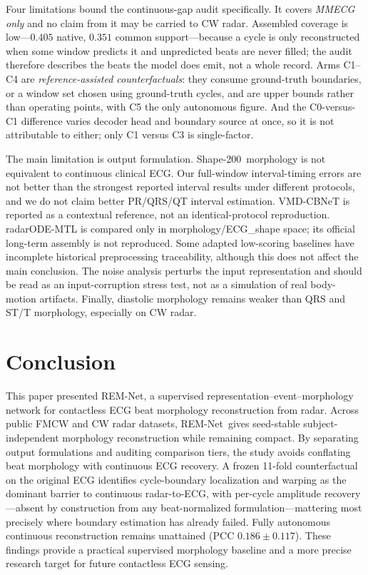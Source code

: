 \documentclass[lettersize,journal]{IEEEtran}
\newcommand{\remnet}{REM-Net\xspace}
\newcommand{\shape}{Shape-200\xspace}
\begin{document}
Four limitations bound the continuous-gap audit specifically. It covers \emph{MMECG only} and no claim from it may be carried to CW radar. Assembled coverage is low---$0.405$ native, $0.351$ common support---because a cycle is only reconstructed when some window predicts it and unpredicted beats are never filled; the audit therefore describes the beats the model does emit, not a whole record. Arms C1--C4 are \emph{reference-assisted counterfactuals}: they consume ground-truth boundaries, or a window set chosen using ground-truth cycles, and are upper bounds rather than operating points, with C5 the only autonomous figure. And the C0-versus-C1 difference varies decoder head and boundary source at once, so it is not attributable to either; only C1 versus C3 is single-factor.

The main limitation is output formulation. \shape\ morphology is not equivalent to continuous clinical ECG. Our full-window interval-timing errors are not better than the strongest reported interval results under different protocols, and we do not claim better PR/QRS/QT interval estimation. VMD-CBNeT is reported as a contextual reference, not an identical-protocol reproduction. radarODE-MTL is compared only in morphology/ECG\_shape space; its official long-term assembly is not reproduced. Some adapted low-scoring baselines have incomplete historical preprocessing traceability, although this does not affect the main conclusion. The noise analysis perturbs the input representation and should be read as an input-corruption stress test, not as a simulation of real body-motion artifacts. Finally, diastolic morphology remains weaker than QRS and ST/T morphology, especially on CW radar.

\section{Conclusion}
This paper presented \remnet, a supervised representation--event--morphology network for contactless ECG beat morphology reconstruction from radar. Across public FMCW and CW radar datasets, \remnet\ gives seed-stable subject-independent morphology reconstruction while remaining compact. By separating output formulations and auditing comparison tiers, the study avoids conflating beat morphology with continuous ECG recovery. A frozen 11-fold counterfactual on the original ECG identifies cycle-boundary localization and warping as the dominant barrier to continuous radar-to-ECG, with per-cycle amplitude recovery---absent by construction from any beat-normalized formulation---mattering most precisely where boundary estimation has already failed. Fully autonomous continuous reconstruction remains unattained (PCC $0.186\pm0.117$). These findings provide a practical supervised morphology baseline and a more precise research target for future contactless ECG sensing.



\end{document}
